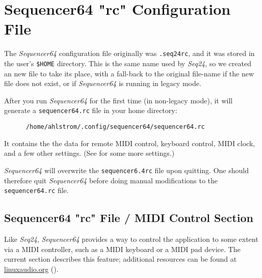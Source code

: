 %
%
%

\section{Sequencer64 "rc" Configuration File}
\label{sec:seq64_rc_file}

   \index{[sequencer64.rc]}   %
   The \textsl{Sequencer64} configuration file originally was \texttt{.seq24rc},
   and it was stored in the user's \texttt{\$HOME} directory.
   This is the same name used by \textsl{Seq24}, so we created an new file
   to take its place, with a fall-back to the original file-name if the new
   file does not exist, or if \textsl{Sequencer64} is running in
   legacy mode.

   After you run \textsl{Sequencer64} for the first time (in non-legacy
   mode), it will generate a \texttt{sequencer64.rc} file in your home
   directory:

   \begin{verbatim}
      /home/ahlstrom/.config/sequencer64/sequencer64.rc
   \end{verbatim}

   It contains the the data for remote MIDI control, keyboard
   control, MIDI clock, and a few other settings.
   (See  for some more settings.)

   \textsl{Sequencer64} will overwrite the \texttt{sequencer6.4rc} file upon
   quitting.  One should therefore quit \textsl{Sequencer64} before doing
   manual modifications to the \texttt{sequencer64.rc} file.

\subsection{Sequencer64 "rc" File / MIDI Control Section}
\label{subsec:seq64_rc_file_midi_control}

   Like \textsl{Seq24}, \textsl{Sequencer64} provides a way to control the
   application to some extent via a MIDI controller, such as a MIDI keyboard or
   a MIDI pad device.  The current section describes this feature;
   additional resources can be found at \url{linuxaudio.org}
   (\cite{midicontrol}).

